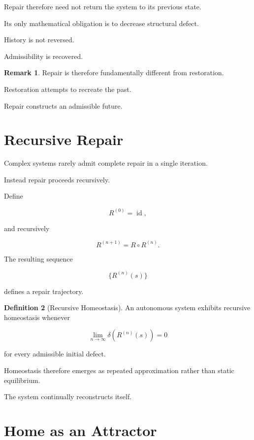 \documentclass[11pt,oneside]{book}
\numberwithin{equation}{chapter}
\theoremstyle{definition}
\newtheorem{definition}{Definition}[chapter]
\newtheorem{remark}[definition]{Remark}
\theoremstyle{plain}
\begin{document}
Repair therefore need not return the system to its previous state.

Its only mathematical obligation is to decrease structural defect.

History is not reversed.

Admissibility is recovered.

\begin{remark}

Repair is therefore fundamentally different from restoration.

Restoration attempts to recreate the past.

Repair constructs an admissible future.

\end{remark}

\section{Recursive Repair}

Complex systems rarely admit complete repair in a single iteration.

Instead repair proceeds recursively.

Define

\[
R^{(0)}
=
\operatorname{id},
\]

and recursively

\[
R^{(n+1)}
=
R
\circ
R^{(n)}.
\]

The resulting sequence

\[
\{
R^{(n)}(s)
\}
\]

defines a repair trajectory.

\begin{definition}[Recursive Homeostasis]

An autonomous system exhibits recursive homeostasis whenever

\[
\lim_{n\rightarrow\infty}
\delta
\left(
R^{(n)}(s)
\right)
=
0
\]

for every admissible initial defect.

\end{definition}

Homeostasis therefore emerges as repeated approximation rather than static
equilibrium.

The system continually reconstructs itself.

\section{Home as an Attractor}
\end{document}
